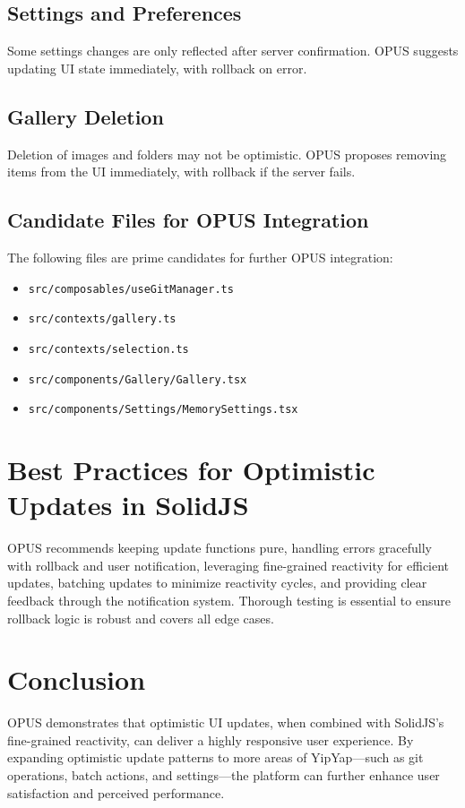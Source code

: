 \documentclass[10pt]{article}
\begin{document}
\subsection{Settings and Preferences}
Some settings changes are only reflected after server confirmation. OPUS suggests updating UI state immediately, with rollback on error.

\subsection{Gallery Deletion}
Deletion of images and folders may not be optimistic. OPUS proposes removing items from the UI immediately, with rollback if the server fails.

\subsection{Candidate Files for OPUS Integration}
The following files are prime candidates for further OPUS integration:
\begin{itemize}
    \item \texttt{src/composables/useGitManager.ts}
    \item \texttt{src/contexts/gallery.ts}
    \item \texttt{src/contexts/selection.ts}
    \item \texttt{src/components/Gallery/Gallery.tsx}
    \item \texttt{src/components/Settings/MemorySettings.tsx}
\end{itemize}

\section{Best Practices for Optimistic Updates in SolidJS}
OPUS recommends keeping update functions pure, handling errors gracefully with rollback and user notification, leveraging fine-grained reactivity for efficient updates, batching updates to minimize reactivity cycles, and providing clear feedback through the notification system. Thorough testing is essential to ensure rollback logic is robust and covers all edge cases.

\section{Conclusion}
OPUS demonstrates that optimistic UI updates, when combined with SolidJS's fine-grained reactivity, can deliver a highly responsive user experience. By expanding optimistic update patterns to more areas of YipYap---such as git operations, batch actions, and settings---the platform can further enhance user satisfaction and perceived performance.
\end{document}
